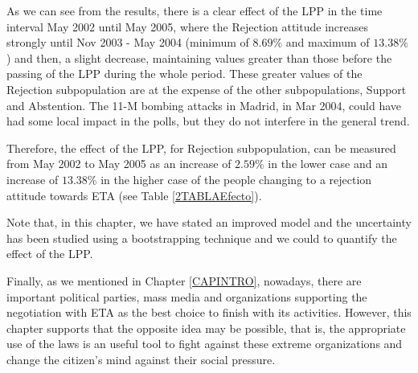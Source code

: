 As we can see from the results, there is a clear effect of the LPP in the time interval May 2002 until May 2005, where the Rejection attitude increases strongly until Nov 2003 - May 2004 (minimum of $8.69\%$ and maximum of $13.38\%$) and then, a slight decrease, maintaining values greater than those before the passing of the LPP during the whole period. These greater values of the Rejection subpopulation are at the expense of the other subpopulations, Support and Abstention. The 11-M bombing attacks in Madrid, in Mar 2004, could have had some local impact in the polls, but they do not interfere in the general trend.

Therefore, the effect of the LPP, for Rejection subpopulation, can be measured from May 2002 to  May 2005 as an increase of $2.59\%$ in the lower case and an increase of $13.38\%$ in the higher case of the people changing to a rejection attitude towards ETA (see Table \ref{2TABLAEfecto}).

Note that, in this chapter, we have stated an improved model and the uncertainty has been studied using a bootstrapping technique and we could to quantify the effect of the LPP.

Finally, as we mentioned in Chapter \ref{CAPINTRO}, nowadays, there are important political parties, mass media and organizations supporting the negotiation with ETA as the best choice to finish with its activities. However, this chapter supports that the opposite idea may be possible, that is, the appropriate use of the laws is an useful tool to fight against these extreme organizations and change the citizen's mind against their social pressure. 


